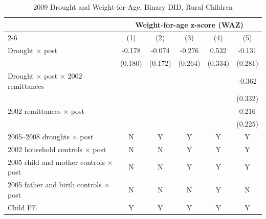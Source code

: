 \documentclass[12pt]{article}
\begin{document}
\begin{longtable}{l*{5}{c}}
\caption{2009 Drought and Weight-for-Age, Binary DID, Rural Children}\\
\toprule
 & \multicolumn{5}{c}{Weight-for-age z-score (WAZ)}\\
\cmidrule(lr){2-6}
            &\multicolumn{1}{c}{(1)}         &\multicolumn{1}{c}{(2)}         &\multicolumn{1}{c}{(3)}         &\multicolumn{1}{c}{(4)}         &\multicolumn{1}{c}{(5)}         \\
\midrule
Drought \ensuremath{\times} post&      -0.178         &      -0.074         &      -0.276         &       0.532         &      -0.131         \\
            &     (0.180)         &     (0.172)         &     (0.264)         &     (0.334)         &     (0.281)         \\
Drought \ensuremath{\times} post \ensuremath{\times} 2002 remittances&                     &                     &                     &                     &      -0.362         \\
            &                     &                     &                     &                     &     (0.332)         \\
2002 remittances \ensuremath{\times} post&                     &                     &                     &                     &       0.216         \\
            &                     &                     &                     &                     &     (0.225)         \\
\midrule
2005--2008 droughts \ensuremath{\times} post&           N         &           Y         &           Y         &           Y         &           Y         \\
2002 household controls \ensuremath{\times} post&           N         &           N         &           Y         &           Y         &           Y         \\
2005 child and mother controls \ensuremath{\times} post&           N         &           N         &           Y         &           Y         &           Y         \\
2005 father and birth controls \ensuremath{\times} post&           N         &           N         &           N         &           Y         &           N         \\
Child FE    &           Y         &           Y         &           Y         &           Y         &           Y         \\

\end{longtable}
\end{document}
